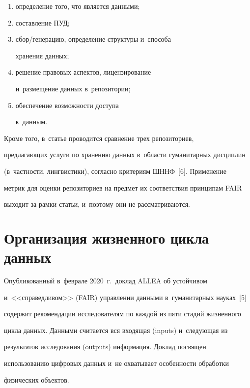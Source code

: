 \begin{enumerate}[(1)]

\item определение того, что является данными; 

\item составление ПУД; 

\item сбор/генерацию, определение структуры и~способа 

хранения данных; 

\item решение правовых аспектов, лицензирование 

и~размещение данных в~репозитории; 

\item обеспечение возможности доступа 

к~данным.

\end{enumerate}

 Кроме того, в~статье проводится сравнение трех репозиториев, 

предлагающих услуги по хранению данных в~области гуманитарных дисциплин 

(в~частности, лингвистики), согласно критериям ШННФ~[6]. Применение 

метрик для оценки репозиториев на предмет их соответствия принципам FAIR 

выходит за рамки статьи, и~поэтому они не рассматриваются.

  

  \section{Организация жизненного цикла данных}

  

  Опубликованный в~феврале 2020~г.\ доклад ALLEA об устойчивом 

и~<<справедливом>> (FAIR) управлении данными в~гуманитарных науках~[5] 

содержит рекомендации исследователям по каждой из пяти стадий жизненного 

цикла данных. Данными считается вся входящая (inputs) и~следующая из 

результатов исследования (outputs) информация. Доклад посвящен 

использованию цифровых данных и~не охватывает особенности обработки 

физических объектов.

